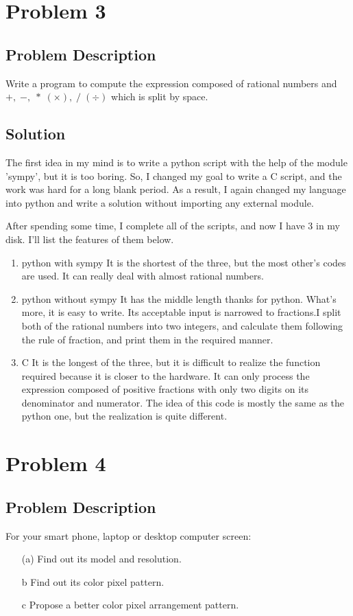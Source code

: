 \documentclass{article}
\begin{document}
\section{Problem 3}

\subsection{Problem Description}
Write a program to compute the expression composed of rational numbers and $+,\; -,\; * \;(\times), \; / \;(\div)$ which is split by space.

\subsection{Solution}
The first idea in my mind is to write a python script with the help of the module 'sympy', but it is too boring. So, I changed my goal to write a C script, and the work was hard for a long blank period. As a result, I again changed my language into python and write a solution without importing any external module.

After spending some time, I complete all of the scripts, and now I have 3 in my disk. I'll list the features of them below.

\begin{enumerate}
    \item python with sympy
            It is the shortest of the three, but the most other's codes are used. It can really deal with almost rational numbers.
    \item python without sympy
            It has the middle length thanks for python. What's more, it is easy to write. Its acceptable input is narrowed to fractions.I split both of the rational numbers into two integers, and calculate them following the rule of fraction, and print them in the required manner.
    \item C
            It is the longest of the three, but it is difficult to realize the function required because it is closer to the hardware. It can only process the expression composed of positive fractions with only two digits on its denominator and numerator. The idea of this code is mostly the same as the python one, but the realization is quite different.
\end{enumerate}

\section{Problem 4}
\subsection{Problem Description}
For your smart phone, laptop or desktop computer screen:
\begin{enumerate}
    \item[(a)] Find out its model and resolution.
    \item[{b}] Find out its color pixel pattern.
    \item[{c}] Propose a better color pixel arrangement pattern.
\end{enumerate}
\end{document}

